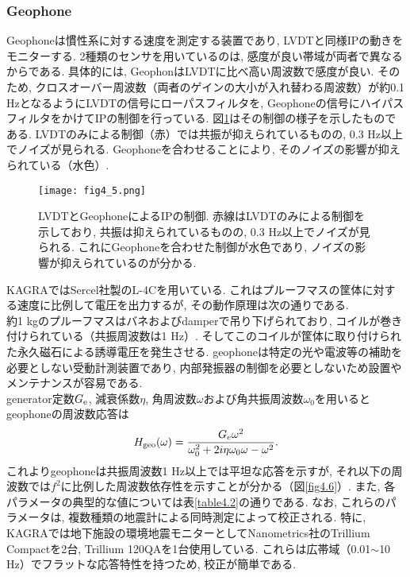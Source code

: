 \subsubsection{Geophone}
\vskip3mm
Geophoneは慣性系に対する速度を測定する装置であり, LVDTと同様IPの動きをモニターする. 2種類のセンサを用いているのは, 感度が良い帯域が両者で異なるからである. 具体的には, GeophonはLVDTに比べ高い周波数で感度が良い. そのため, クロスオーバー周波数（両者のゲインの大小が入れ替わる周波数）が約0.1 HzとなるようにLVDTの信号にローパスフィルタを, Geophoneの信号にハイパスフィルタをかけてIPの制御を行っている. 図\ref{fig4.5}はその制御の様子を示したものである. LVDTのみによる制御（赤）では共振が抑えられているものの, 0.3 Hz以上でノイズが見られる. Geophoneを合わせることにより, そのノイズの影響が抑えられている（水色）. 
\begin{figure}[H]
\begin{center}
\texttt{[image: fig4\_5.png]} 
\caption[LVDTとGeophoneによるIPの制御]{LVDTとGeophoneによるIPの制御\cite{37}. 赤線はLVDTのみによる制御を示しており, 共振は抑えられているものの, 0.3 Hz以上でノイズが見られる. これにGeophoneを合わせた制御が水色であり, ノイズの影響が抑えられているのが分かる.}
\label{fig4.5}
\end{center}
\end{figure}
KAGRAではSercel社製のL-4Cを用いている. これはプルーフマスの筐体に対する速度に比例して電圧を出力するが, その動作原理は次の通りである. \\
\quad 約1 kgのプルーフマスはバネおよびdamperで吊り下げられており, コイルが巻き付けられている（共振周波数は1 Hz）. そしてこのコイルが筐体に取り付けられた永久磁石による誘導電圧を発生させる. geophoneは特定の光や電波等の補助を必要としない受動計測装置であり, 内部発振器の制御を必要としないため設置やメンテナンスが容易である. \\
\quad generator定数$G_{\rm e}$, 減衰係数$\eta$, 角周波数$\omega$および角共振周波数$\omega_0$を用いるとgeophoneの周波数応答は
\begin{equation}
H_{\rm geo}(\omega)=\frac{G_{e}\omega^2}{\omega_0^2+2i\eta\omega_0\omega-\omega^2}.
\end{equation}
これよりgeophoneは共振周波数1 Hz以上では平坦な応答を示すが, それ以下の周波数では$f^2$に比例した周波数依存性を示すことが分かる（図\ref{fig4.6}）. また, 各パラメータの典型的な値については表\ref{table4.2}の通りである. なお, これらのパラメータは, 複数種類の地震計による同時測定によって校正される. 特に, KAGRAでは地下施設の環境地震モニターとしてNanometrics社のTrillium Compactを2台, Trillium 120QAを1台使用している. これらは広帯域（0.01$\sim$10 Hz）でフラットな応答特性を持つため, 校正が簡単である. \\
